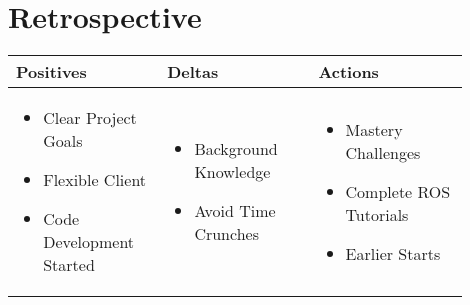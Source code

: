 \section{Retrospective}
\vspace{1em}
\begin{tabular}{| p{0.3\linewidth} | p{0.3\linewidth} | p{0.3\linewidth} |}
\hline\bf Positives & \bf Deltas & \bf Actions \\\hline

\begin{itemize}
\item Clear Project Goals
\item Flexible Client
\item Code Development Started
\end{itemize}

&
\begin{itemize}
\item Background Knowledge
\item Avoid Time Crunches
\end{itemize}

&
\begin{itemize}
\item Mastery Challenges
\item Complete ROS Tutorials
\item Earlier Starts
\end{itemize}\\\hline

\end{tabular}
